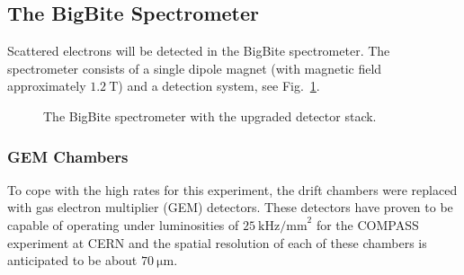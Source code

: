 \subsection{The BigBite Spectrometer}
%
\label{sec:expsetup_bigbite}             
%
Scattered electrons will be detected in the BigBite spectrometer.
The spectrometer consists of a single dipole magnet (with magnetic field approximately $1.2~\mathrm{T}$) and a detection system, see Fig.~\ref{fig:BB}.  

\begin{figure}[htbp]
\begin{center}
\end{center}
\caption{The BigBite spectrometer with the upgraded detector stack.}
\label{fig:BB}
\end{figure} 

\subsubsection{GEM Chambers}
To cope with the high rates for this experiment, the drift chambers were replaced with gas electron multiplier (GEM) detectors.  
These detectors have proven to be capable of operating under luminosities of $25~\mathrm{kHz/mm}^2$ for the COMPASS experiment at CERN and the spatial resolution of each of these chambers is anticipated to be about $70~\mathrm{\mu m}$.

